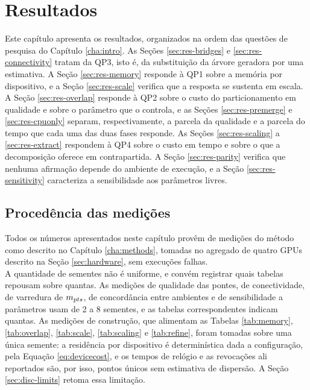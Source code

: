 
\chapter{Resultados\label{cha:results}}

Este capítulo apresenta os resultados, organizados na ordem das questões de pesquisa do Capítulo \ref{cha:intro}. As Seções \ref{sec:res-bridges} e \ref{sec:res-connectivity} tratam da QP3, isto é, da substituição da árvore geradora por uma estimativa. A Seção \ref{sec:res-memory} responde à QP1 sobre a memória por dispositivo, e a Seção \ref{sec:res-scale} verifica que a resposta se sustenta em escala. A Seção \ref{sec:res-overlap} responde à QP2 sobre o custo do particionamento em qualidade e sobre o parâmetro que o controla, e as Seções \ref{sec:res-premerge} e \ref{sec:res-cpuonly} separam, respectivamente, a parcela da qualidade e a parcela do tempo que cada uma das duas fases responde. As Seções \ref{sec:res-scaling} a \ref{sec:res-extract} respondem à QP4 sobre o custo em tempo e sobre o que a decomposição oferece em contrapartida. A Seção \ref{sec:res-parity} verifica que nenhuma afirmação depende do ambiente de execução, e a Seção \ref{sec:res-sensitivity} caracteriza a sensibilidade aos parâmetros livres.

\section{Procedência das medições\label{sec:res-provenance}}

Todos os números apresentados neste capítulo provêm de medições do método como descrito no Capítulo \ref{cha:methods}, tomadas no agregado de quatro \ac{GPU}s descrito na Seção \ref{sec:hardware}, sem execuções falhas.\\

A quantidade de sementes não é uniforme, e convém registrar quais tabelas repousam sobre quantas. As medições de qualidade das pontes, de conectividade, de varredura de $m_{pts}$, de concordância entre ambientes e de sensibilidade a parâmetros usam de 2 a 8 sementes, e as tabelas correspondentes indicam quantas. As medições de construção, que alimentam as Tabelas \ref{tab:memory}, \ref{tab:overlap}, \ref{tab:scale}, \ref{tab:scaling} e \ref{tab:refine}, foram tomadas sobre uma única semente: a residência por dispositivo é determinística dada a configuração, pela Equação \eqref{eq:devicecost}, e os tempos de relógio e as revocações ali reportados são, por isso, pontos únicos sem estimativa de dispersão. A Seção \ref{sec:disc-limits} retoma essa limitação.\\

